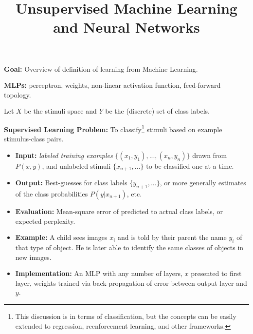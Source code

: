 \documentclass[12pt]{article}
\begin{document}
\title{\sc \large Unsupervised Machine Learning and Neural Networks\vspace{-2ex}}

\theoremstyle{definition}
\newtheorem{axiom}{Axiom}
\newtheorem{definition}{Definition}
\newtheorem{theorem}{Theorem}

\newcommand{\scare}[1]{`#1'} 

\setcounter{secnumdepth}{-1} 


\textbf{Goal:} Overview of definition of learning from Machine Learning.

\textbf{MLPs:} perceptron, weights, non-linear activation function, feed-forward topology.

Let $X$ be the stimuli space and $Y$ be the (discrete) set of class labels.

\textbf{Supervised Learning Problem:} To classify\footnote{ This discussion is in terms of classification, but the concepts can be easily extended to regression, reenforcement learning, and other frameworks.} stimuli based on example stimulus-class pairs.
\begin{itemize}
\item \textbf{Input:} \textit{labeled training examples} $\{(x_1,y_1),...,(x_n,y_n)\}$ drawn from $P(x,y)$,
  and unlabeled stimuli $\{x_{n+1},...\}$ to be classified one at a time.
\item \textbf{Output:} Best-guesses for class labels $\{y_{n+1},...\}$, 
  or more generally estimates of the class probabilities $P(y|x_{n+1})$, etc.
\item \textbf{Evaluation:} Mean-square error of predicted to actual class labels, or expected perplexity.
\item \textbf{Example:} A child sees images $x_i$ and is told by their parent the name $y_i$ of that type of object. He is later able to identify the same classes of objects in new images.
\item \textbf{Implementation:} An MLP with any number of layers, $x$ presented to first layer, weights trained via back-propagation of error between output layer and $y$.
\end{itemize}
\end{document}
